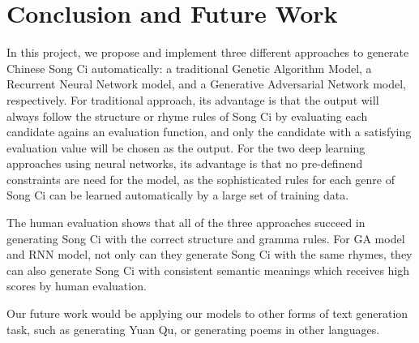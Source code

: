 \section{Conclusion and Future Work} 
In this project, we propose and implement three different approaches to generate Chinese Song Ci automatically: a traditional Genetic Algorithm Model, a Recurrent Neural Network model, and a Generative Adversarial Network model, respectively.
%
For traditional approach, its advantage is that the output will always follow the structure or rhyme rules of Song Ci by evaluating each candidate agains an evaluation function,  and only the candidate with a satisfying evaluation value will be chosen as the output.
%
For the two deep learning approaches using neural networks, its advantage is that no pre-definend constraints are need for the model, as  the sophisticated rules for each genre of Song Ci can be learned automatically by a large set of training data.

The human evaluation shows that all of the three approaches succeed in generating Song Ci with the correct structure and gramma rules. For GA model and RNN model, not only can they generate Song Ci with the same rhymes, they can also generate Song Ci with consistent semantic meanings which receives high scores by human evaluation. 

Our future work would be applying our models to other forms of text generation task, such as generating Yuan Qu, or generating poems in other languages.